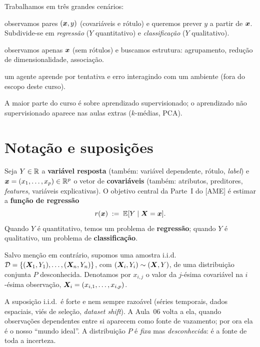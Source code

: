 \documentclass[11pt,a4paper]{article}
\begin{document}
Trabalhamos em três grandes cenários:
\begin{description}[leftmargin=2.6cm,style=nextline]
  \item[Supervisionado] observamos pares $(\bm{x},y)$ (covariáveis e rótulo) e
        queremos prever $y$ a partir de $\bm{x}$. Subdivide-se em \emph{regressão}
        ($Y$ quantitativo) e \emph{classificação} ($Y$ qualitativo).
  \item[Não supervisionado] observamos apenas $\bm{x}$ (sem rótulos) e buscamos
        estrutura: agrupamento, redução de dimensionalidade, associação.
  \item[Por reforço] um agente aprende por tentativa e erro interagindo com um
        ambiente (fora do escopo deste curso).
\end{description}
A maior parte do curso é sobre aprendizado supervisionado; o aprendizado não
supervisionado aparece nas aulas extras ($k$-médias, PCA).

\section{Notação e suposições}
Seja $Y\in\mathbb{R}$ a \textbf{variável resposta} (também: variável dependente, rótulo,
\emph{label}) e $\bm{x}=(x_1,\dots,x_p)\in\mathbb{R}^p$ o vetor de \textbf{covariáveis}
(também: atributos, preditores, \emph{features}, variáveis explicativas). O
objetivo central da Parte~I do [AME] é estimar a \textbf{função de regressão}
\begin{equation}\label{eq:r}
  r(\bm{x}) \;:=\; \mathbb{E}[Y\mid \bm{X}=\bm{x}].
\end{equation}
Quando $Y$ é quantitativo, temos um problema de \textbf{regressão}; quando $Y$ é
qualitativo, um problema de \textbf{classificação}.

\begin{definicao}
Salvo menção em contrário, supomos uma amostra i.i.d.
$\mathcal{D}=\{(\bm{X}_1,Y_1),\dots,(\bm{X}_n,Y_n)\}$, com $(\bm{X}_i,Y_i)\sim (\bm{X},Y)$, de uma
distribuição conjunta $P$ desconhecida. Denotamos por $x_{i,j}$ o valor da
$j$-ésima covariável na $i$-ésima observação, $\bm{X}_i=(x_{i,1},\dots,x_{i,p})$.
\end{definicao}

\begin{atencao}
A suposição i.i.d.\ é forte e nem sempre razoável (séries temporais, dados
espaciais, viés de seleção, \emph{dataset shift}). A Aula~06 volta a ela, quando
observações dependentes entre si aparecem como fonte de vazamento; por ora ela é o
nosso ``mundo ideal''. A distribuição $P$ é \emph{fixa} mas
\emph{desconhecida}: é a fonte de toda a incerteza.
\end{atencao}
\end{document}
